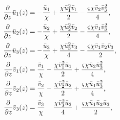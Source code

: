 \documentclass[11pt,a4paper]{article}
\begin{document}
\begin{align}
  \frac{\partial}{\partial z} \bar{u}_1(z) &=  - \frac{\bar{u}_1}{\chi} + \frac{\chi \bar{u}_1^{2} \bar{v}_1}{2} - \frac{\varsigma \chi \bar{v}_2 \bar{v}_3^{2}}{4}, \notag \\
  \frac{\partial}{\partial z} \bar{u}_2(z) &=  - \frac{\bar{u}_2}{\chi} + \frac{\chi \bar{u}_2^{2} \bar{v}_2}{2} - \frac{\varsigma \chi \bar{v}_1 \bar{v}_3^{2}}{4}, \notag \\
  \frac{\partial}{\partial z} \bar{u}_3(z) &=  - \frac{\bar{u}_3}{\chi} + \frac{\chi \bar{u}_3^{2} \bar{v}_3}{4} - \frac{\varsigma \chi \bar{v}_1 \bar{v}_2 \bar{v}_3}{2}, \notag \\
  \frac{\partial}{\partial z} \bar{v}_1(z) &= \frac{\bar{v}_1}{\chi} - \frac{\chi \bar{v}_1^{2} \bar{u}_1}{2} + \frac{\varsigma \chi \bar{u}_2 \bar{u}_3^{2}}{4}, \notag \\
  \frac{\partial}{\partial z} \bar{v}_2(z) &= \frac{\bar{v}_2}{\chi} - \frac{\chi \bar{v}_2^{2} \bar{u}_2}{2} + \frac{\varsigma \chi \bar{u}_1 \bar{u}_3^{2}}{4}, \notag \\
  \frac{\partial}{\partial z} \bar{v}_3(z) &= \frac{\bar{v}_3}{\chi} - \frac{\chi \bar{v}_3^{2} \bar{u}_3}{4} + \frac{\varsigma \chi \bar{u}_1 \bar{u}_2 \bar{u}_3}{2}, \label{cc:eq:ubar-vbar-degfwm-system}
\end{align}
\end{document}
